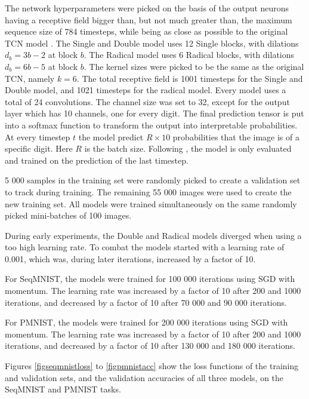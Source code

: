 \documentclass[a4paper, twoside]{article}
\begin{document}
The network hyperparameters were picked on the basis of the output neurons having a receptive field bigger than, but not much greater than, the maximum sequence size of 784 timesteps, while being as close as possible to the original TCN model \cite{tcn}. The Single and Double model uses 12 Single blocks, with dilations $d_b=3b-2$ at block $b$. The Radical model uses 6 Radical blocks, with dilations $d_b=6b-5$ at block $b$. The kernel sizes were picked to be the same as the original TCN, namely $k=6$. The total receptive field is 1001 timesteps for the Single and Double model, and 1021 timesteps for the radical model. Every model uses a total of 24 convolutions. The channel size was set to 32, except for the output layer which has 10 channels, one for every digit. The final prediction tensor is put into a softmax function to transform the output into interpretable probabilities. At every timestep $t$ the model predict $R \times 10$ probabilities that the image is of a specific digit. Here $R$ is the batch size. Following \cite{tcn}, the model is only evaluated and trained on the prediction of the last timestep.

5 000 samples in the training set were randomly picked to create a validation set to track during training. The remaining 55 000 images were used to create the new training set. All models were trained simultaneously on the same randomly picked mini-batches of 100 images.

During early experiments, the Double and Radical models diverged when using a too high learning rate. To combat the models started with a learning rate of 0.001, which was, during later iterations, increased by a factor of 10.

For SeqMNIST, the models were trained for 100 000 iterations using SGD with momentum. The learning rate was increased by a factor of 10 after 200 and 1000 iterations, and decreased by a factor of 10 after 70 000 and 90 000 iterations.

For PMNIST, the models were trained for 200 000 iterations using SGD with momentum. The learning rate was increased by a factor of 10 after 200 and 1000 iterations, and decreased by a factor of 10 after 130 000 and 180 000 iterations.

Figures \ref{figseqmnistloss} to \ref{figpmnistacc} show the loss functions of the training and validation sets, and the validation accuracies of all three models, on the SeqMNIST and PMNIST tasks.
\end{document}
